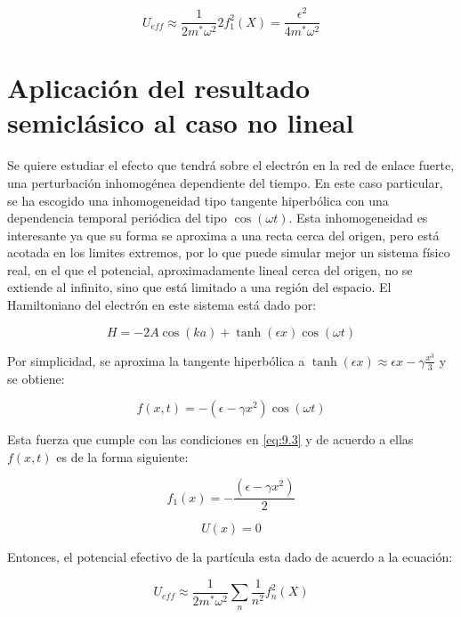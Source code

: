 \begin{equation}\label{eq:9.32}
    U_{eff} \approx \frac{1}{2m^*\omega^2} 2f_{1}^2(X)=\frac{\epsilon^2}{4m^*\omega^2}
\end{equation}


\section{Aplicación del resultado semiclásico al caso no lineal}


Se quiere estudiar el efecto que tendrá sobre el electrón en la red de enlace fuerte, una perturbación inhomogénea dependiente del tiempo. En este caso particular, se ha escogido una inhomogeneidad tipo tangente hiperbólica con una dependencia temporal periódica del tipo $\cos(\omega t)$. Esta inhomogeneidad es interesante ya que su forma se aproxima a una recta cerca del origen, pero está acotada en los limites extremos, por lo que puede simular mejor un sistema físico real, en el que el potencial, aproximadamente lineal cerca del origen, no se extiende al infinito, sino que está limitado a una región del espacio. El Hamiltoniano del electrón en este sistema está dado por:  

\begin{equation}\label{eq:9.33}
  H=-2A\cos(k a)+\tanh(\epsilon x)\cos{( \omega t)}  
\end{equation}

Por simplicidad, se aproxima la tangente hiperbólica a $\tanh(\epsilon x)\approx \epsilon x - \gamma\frac{x^3}{3}$ y se obtiene:

\begin{equation}\label{eq:9.34}
    f(x,t)=-(\epsilon-\gamma x^2) \cos(\omega t)
\end{equation}

Esta fuerza que cumple con las condiciones en \ref{eq:9.3} y de acuerdo a ellas $f(x,t)$ es de la forma siguiente:

\begin{equation}\label{eq:9.35}
    f_{1}(x)=-\frac{(\epsilon-\gamma x^2)}{2}
\end{equation}

\begin{equation}\label{eq:9.36}
    U(x)=0
\end{equation}

Entonces, el potencial efectivo de la partícula esta dado de acuerdo a la ecuación:
    
\begin{equation}\label{eq:9.37}
        U_{eff} \approx \frac{1}{2m^*\omega^2}\sum_n \frac{1}{n^2} f_n^2(X)
    \end{equation}


